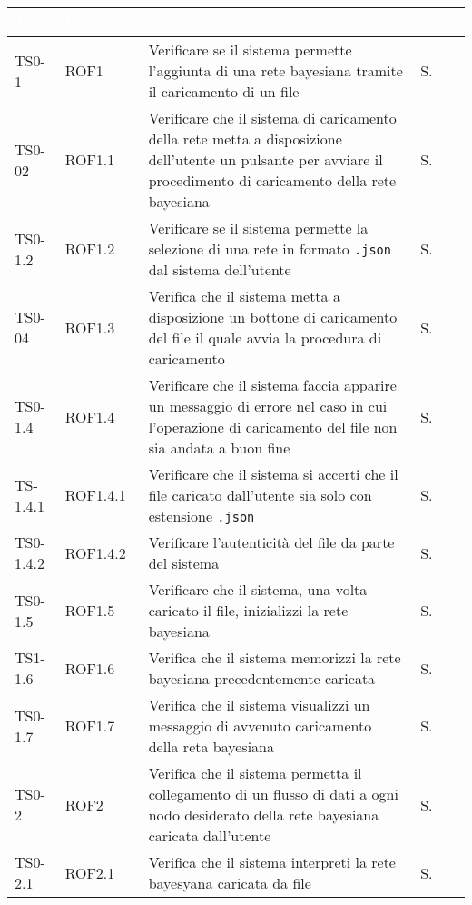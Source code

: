 \begin{longtable}{|C{.15\textwidth}|C{.14\textwidth}|m{.52\textwidth}|m{.08\textwidth}|}
\hline
{}\textbf{\textcolor{white}{Test}} & \textbf{\textcolor{white}{Requisito}} & \textbf{\textcolor{white}{Descrizione}} & \textbf{\textcolor{white}{Esito}}\\
\hline \hline
\endhead

TS0-1 & ROF1 & Verificare se il sistema permette l'aggiunta di una rete bayesiana tramite il caricamento di un file & S. \\
\hline
{} TS0-02 & ROF1.1 & Verificare che il sistema di caricamento della rete metta a disposizione dell'utente un pulsante per avviare il procedimento di caricamento della rete bayesiana & S.\\
\hline
TS0-1.2 & ROF1.2 & Verificare se il sistema permette la selezione di una rete in formato \texttt{.json} dal sistema dell'utente & S. \\
\hline
{} TS0-04 & ROF1.3 & Verifica che il sistema metta a disposizione un bottone di caricamento del file il quale avvia la procedura di caricamento & S. \\
\hline
TS0-1.4 &  ROF1.4 & Verificare che il sistema faccia apparire un messaggio di errore nel caso in cui l'operazione di caricamento del file non sia andata a buon fine & S. \\
\hline
{} TS-1.4.1 & ROF1.4.1 & Verificare che il sistema si accerti che il file caricato dall'utente sia solo con estensione \texttt{.json} & S. \\
\hline
TS0-1.4.2 & ROF1.4.2 & Verificare l'autenticità del file da parte del sistema & S. \\
\hline 
{} TS0-1.5  & ROF1.5 & Verificare che il sistema, una volta caricato il file, inizializzi la rete bayesiana & S. \\
\hline 
TS1-1.6 & ROF1.6 & Verifica che il sistema memorizzi la rete bayesiana precedentemente caricata & S. \\
\hline
{} TS0-1.7 & ROF1.7 & Verifica che il sistema visualizzi un messaggio di avvenuto caricamento della reta bayesiana & S. \\
\hline
TS0-2 & ROF2 & Verifica che il sistema permetta il collegamento di un flusso di dati a ogni nodo desiderato della rete bayesiana caricata dall'utente & S. \\
\hline
{} TS0-2.1 & ROF2.1 & Verifica che il sistema interpreti la rete bayesyana caricata da file & S. \\

\end{longtable}
